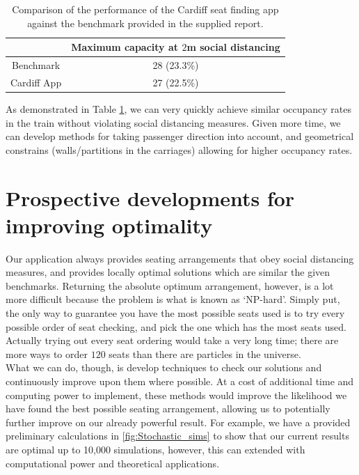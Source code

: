 \documentclass[11pt,a4paper]{article}
\begin{document}
\begin{table}[ht!]
\begin{center}
 \begin{tabular}{|c |c|}
 \hline
& \textbf{Maximum capacity at $2$m social distancing }\\
 \hline
 Benchmark &   28 (23.3\%)\footnotemark \\
 \hline
 Cardiff App  & 27 (22.5\%)\\
\hline
\end{tabular}
\end{center}
\caption{Comparison of the performance of the Cardiff seat finding app against the benchmark provided in the supplied report.}
\label{tab:performance}
\end{table}


As demonstrated in Table \ref{tab:performance}, we can very quickly achieve similar occupancy rates in the train without violating social distancing measures. Given more time, we can develop methods for taking passenger direction into account, and geometrical constrains (walls/partitions in the carriages) allowing for higher occupancy rates.

\section*{Prospective developments for improving optimality}
Our application always provides seating arrangements that obey social distancing measures, and provides locally optimal solutions which are similar the given benchmarks. Returning the  absolute optimum arrangement, however, is a lot more difficult because the problem is what is known as `NP-hard'.  Simply put, the only way to guarantee you have the most possible seats used is to try every possible order of seat checking, and pick the one which has the most seats used. Actually trying out every seat ordering would take a very long time; there are more ways to order $120$ seats than there are particles in the universe.\\

What we can do, though, is develop techniques to check our solutions and continuously improve upon them where possible. At a cost of additional time and computing power to implement, these methods would improve the likelihood we have found the best possible seating arrangement, allowing us to potentially further improve on our already powerful result. For example, we have a provided preliminary calculations in \autoref{fig:Stochastic_sims} to show that our current results are optimal up to 10,000 simulations, however, this can extended with computational power and theoretical applications.\\
\end{document}

